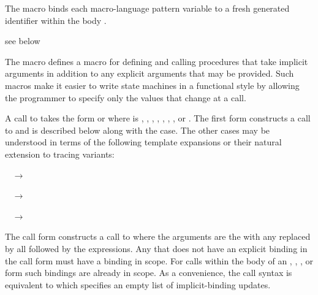 The  macro binds each macro-language
pattern variable  to a fresh generated identifier
within the body .

\begin{syntax}
\end{syntax}
\expandsto{} see below

The  macro defines a macro  for defining
and calling procedures that take implicit  arguments in addition
to any explicit arguments that may be provided.
Such macros make it easier to write state machines in a functional style
by allowing the programmer to specify only the values that change at a call.

A call to  takes the form
or
where  is
,
,
,
,
,
,
, or
.
The first form constructs a call to  and is described below
along with the  case.
The other cases may be understood in terms of the following template
expansions or their natural extension to tracing variants:

~
$\rightarrow$

~
$\rightarrow$

~
$\rightarrow$

The call form
constructs a call to  where the arguments are
the  with any  replaced by 
all followed by the  expressions.
Any  that does not have an explicit
 binding in the call form
must have a binding in scope.
For calls within the body of an
,
,
, or
form such bindings are already in scope.
As a convenience, the call syntax  is equivalent to
 which specifies an empty list of implicit-binding updates.

